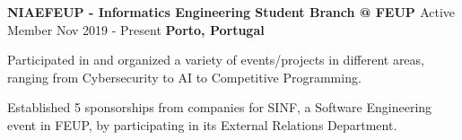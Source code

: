 \begin{cventries}
  \cventry
     {\textbf{NIAEFEUP - Informatics Engineering Student Branch @ FEUP \href{https://ni.fe.up.pt/}{\faExternalLink}}} %
    {Active Member} %
    {Nov 2019 - Present} %
    {\textbf{Porto, Portugal}} %
    {
      \begin{cvitems} %
        \item {Participated in and organized a variety of events/projects in different areas, ranging from Cybersecurity to AI to Competitive Programming.}
        \item {Established 5 sponsorships from companies for SINF, a Software Engineering event in FEUP, by participating in its External Relations Department.}
      \end{cvitems}
    }

\end{cventries}
